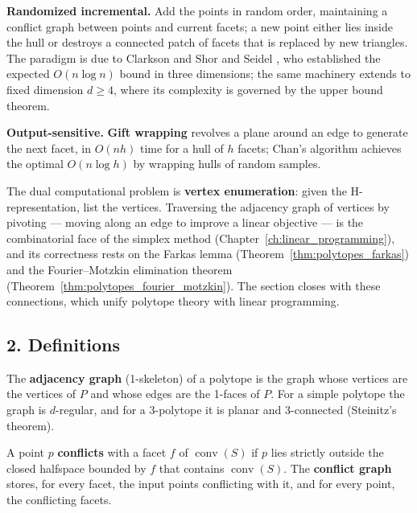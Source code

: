 \textbf{Randomized incremental.} Add the points in random order, maintaining
a conflict graph between points and current facets; a new point either lies
inside the hull or destroys a connected patch of facets that is replaced by
new triangles. The paradigm is due to Clarkson and Shor \cite{clarkson1989}
and Seidel \cite{seidel1991}, who established the expected $O(n \log n)$
bound in three dimensions; the same machinery extends to fixed dimension
$d \ge 4$, where its complexity is governed by the upper bound theorem.

\textbf{Output-sensitive.} \textbf{Gift wrapping} \cite{chand1970} revolves a
plane around an edge to generate the next facet, in $O(n h)$ time for a
hull of $h$ facets; Chan's algorithm \cite{chan1996} achieves the optimal
$O(n \log h)$ by wrapping hulls of random samples.

The dual computational problem is \textbf{vertex enumeration}: given the
H-representation, list the vertices. Traversing the adjacency graph of
vertices by pivoting --- moving along an edge to improve a linear objective
--- is the combinatorial face of the simplex method
(Chapter~\ref{ch:linear_programming}), and its correctness rests on the
Farkas lemma (Theorem~\ref{thm:polytopes_farkas}) and the Fourier--Motzkin
elimination theorem (Theorem~\ref{thm:polytopes_fourier_motzkin}). The
section closes with these connections, which unify polytope theory with
linear programming.

\subsection{2. Definitions}

\begin{definition}\label{def:polytopes_adjacency_graph}
  The \textbf{adjacency graph} (1-skeleton) of a polytope is the graph whose
  vertices are the vertices of $P$ and whose edges are the 1-faces of $P$.
  For a simple polytope the graph is $d$-regular, and for a 3-polytope it is
  planar and 3-connected (Steinitz's theorem).
\end{definition}

\begin{definition}\label{def:polytopes_conflict}
  A point $p$ \textbf{conflicts} with a facet $f$ of
  $\operatorname{conv}(S)$ if $p$ lies strictly outside the closed halfspace
  bounded by $f$ that contains $\operatorname{conv}(S)$. The \textbf{conflict
  graph} stores, for every facet, the input points conflicting with it, and
  for every point, the conflicting facets.
\end{definition}

